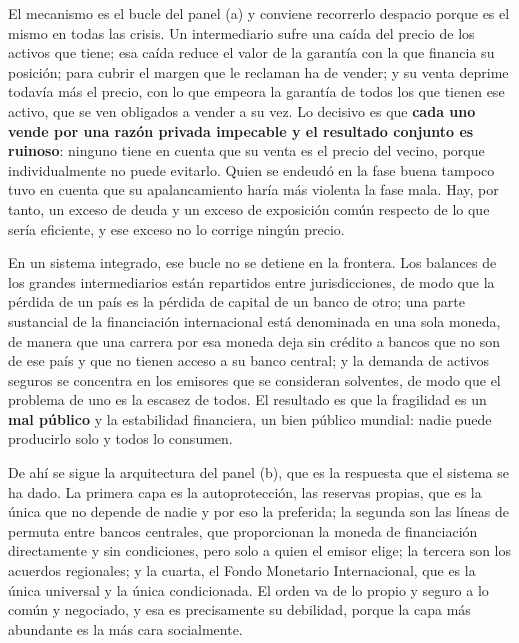 \documentclass[10pt,a4paper]{article}
\begin{document}
El mecanismo es el bucle del panel (a) y conviene recorrerlo despacio porque es el mismo en todas las crisis. Un intermediario sufre una caída del precio de los activos que tiene; esa caída reduce el valor de la garantía con la que financia su posición; para cubrir el margen que le reclaman ha de vender; y su venta deprime todavía más el precio, con lo que empeora la garantía de todos los que tienen ese activo, que se ven obligados a vender a su vez. Lo decisivo es que \textbf{cada uno vende por una razón privada impecable y el resultado conjunto es ruinoso}: ninguno tiene en cuenta que su venta es el precio del vecino, porque individualmente no puede evitarlo. Quien se endeudó en la fase buena tampoco tuvo en cuenta que su apalancamiento haría más violenta la fase mala. Hay, por tanto, un exceso de deuda y un exceso de exposición común respecto de lo que sería eficiente, y ese exceso no lo corrige ningún precio.

En un sistema integrado, ese bucle no se detiene en la frontera. Los balances de los grandes intermediarios están repartidos entre jurisdicciones, de modo que la pérdida de un país es la pérdida de capital de un banco de otro; una parte sustancial de la financiación internacional está denominada en una sola moneda, de manera que una carrera por esa moneda deja sin crédito a bancos que no son de ese país y que no tienen acceso a su banco central; y la demanda de activos seguros se concentra en los emisores que se consideran solventes, de modo que el problema de uno es la escasez de todos. El resultado es que la fragilidad es un \textbf{mal público} y la estabilidad financiera, un bien público mundial: nadie puede producirlo solo y todos lo consumen.

De ahí se sigue la arquitectura del panel (b), que es la respuesta que el sistema se ha dado. La primera capa es la autoprotección, las reservas propias, que es la única que no depende de nadie y por eso la preferida; la segunda son las líneas de permuta entre bancos centrales, que proporcionan la moneda de financiación directamente y sin condiciones, pero solo a quien el emisor elige; la tercera son los acuerdos regionales; y la cuarta, el Fondo Monetario Internacional, que es la única universal y la única condicionada. El orden va de lo propio y seguro a lo común y negociado, y esa es precisamente su debilidad, porque la capa más abundante es la más cara socialmente.
\end{document}
